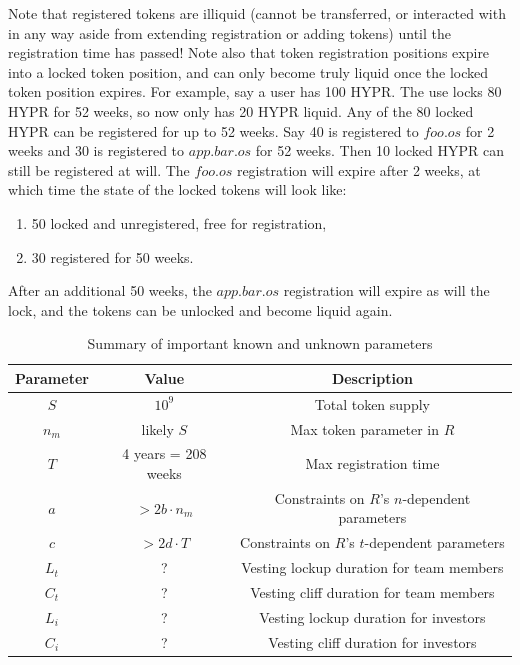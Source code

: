 \documentclass{article}
\begin{document}
Note that registered tokens are illiquid (cannot be transferred, or interacted with in any way aside from extending registration or adding tokens) until the registration time has passed!
Note also that token registration positions expire into a locked token position, and can only become truly liquid once the locked token position expires.
For example, say a user has 100 HYPR.
The use locks 80 HYPR for 52 weeks, so now only has 20 HYPR liquid.
Any of the 80 locked HYPR can be registered for up to 52 weeks.
Say 40 is registered to $foo.os$ for 2 weeks and 30 is registered to $app.bar.os$ for 52 weeks.
Then 10 locked HYPR can still be registered at will.
The $foo.os$ registration will expire after 2 weeks, at which time the state of the locked tokens will look like:
\begin{enumerate}
    \item 50 locked and unregistered, free for registration,
    \item 30 registered for 50 weeks.
\end{enumerate}
After an additional 50 weeks, the $app.bar.os$ registration will expire as will the lock, and the tokens can be unlocked and become liquid again.

\begin{table}[htbp]
    \centering
    \caption{Summary of important known and unknown parameters}
    \label{tab:student-performance}
    \begin{tabular}{|c|c|c|}
    \hline
    \textbf{Parameter} & \textbf{Value} & \textbf{Description} \\
    \hline
    $S$ & $10^9$ & Total token supply \\
    $n_m$ & likely $S$ & Max token parameter in $R$ \\
    $T$ & 4 years = 208 weeks & Max registration time \\
    $a$ & $> 2b \cdot n_m$ & Constraints on $R$'s $n$-dependent parameters \\
    $c$ & $> 2d \cdot T$ & Constraints on $R$'s $t$-dependent parameters \\
    $L_t$ & ? & Vesting lockup duration for team members \\
    $C_t$ & ? & Vesting cliff duration for team members \\
    $L_i$ & ? & Vesting lockup duration for investors \\
    $C_i$ & ? & Vesting cliff duration for investors \\
    \hline
	\end{tabular}
\end{table}
\end{document}
